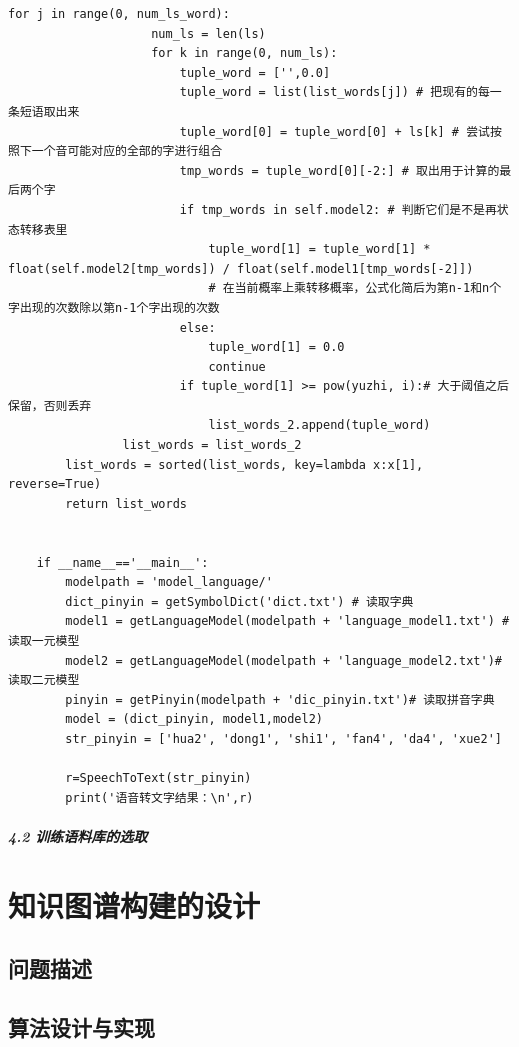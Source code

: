 \documentclass[12pt,a4paper,fancyhdr,openany,oneside]{ctexbook}
\begin{document}
\begin{lstlisting}[style=Python, caption={ModelLanguage.py}, label={ModelLanguage.py}]
                for j in range(0, num_ls_word):
                    num_ls = len(ls)
                    for k in range(0, num_ls):
                        tuple_word = ['',0.0]
                        tuple_word = list(list_words[j]) # 把现有的每一条短语取出来
                        tuple_word[0] = tuple_word[0] + ls[k] # 尝试按照下一个音可能对应的全部的字进行组合
                        tmp_words = tuple_word[0][-2:] # 取出用于计算的最后两个字
                        if tmp_words in self.model2: # 判断它们是不是再状态转移表里
                            tuple_word[1] = tuple_word[1] * float(self.model2[tmp_words]) / float(self.model1[tmp_words[-2]])
                            # 在当前概率上乘转移概率，公式化简后为第n-1和n个字出现的次数除以第n-1个字出现的次数
                        else:
                            tuple_word[1] = 0.0
                            continue
                        if tuple_word[1] >= pow(yuzhi, i):# 大于阈值之后保留，否则丢弃
                            list_words_2.append(tuple_word)
                list_words = list_words_2
        list_words = sorted(list_words, key=lambda x:x[1], reverse=True)
        return list_words


    if __name__=='__main__':
        modelpath = 'model_language/'
        dict_pinyin = getSymbolDict('dict.txt') # 读取字典
        model1 = getLanguageModel(modelpath + 'language_model1.txt') # 读取一元模型
        model2 = getLanguageModel(modelpath + 'language_model2.txt')# 读取二元模型
        pinyin = getPinyin(modelpath + 'dic_pinyin.txt')# 读取拼音字典
        model = (dict_pinyin, model1,model2)
        str_pinyin = ['hua2', 'dong1', 'shi1', 'fan4', 'da4', 'xue2']

        r=SpeechToText(str_pinyin)
        print('语音转文字结果：\n',r)
\end{lstlisting}


\subparagraph{4.2 训练语料库的选取} 

\section{知识图谱构建的设计}
    
\subsection{问题描述}
\subsection{算法设计与实现}
\end{document}
